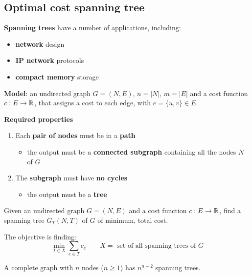 \documentclass[english]{article}
\begin{document}
\newpage

\subsection{Optimal cost spanning tree}

\textbf{Spanning trees} have a number of applications, including:

\begin{itemize}
  \item \textbf{network} design
  \item \textbf{IP network} protocols
  \item \textbf{compact memory} storage
\end{itemize}

\bigskip
\textbf{Model}:
an undirected graph \(G = (N, E), \, n = |N|, \, m = |E|\) and a cost function \(c: E \rightarrow \mathbb{R}\), that assigns a cost to each edge, with \(e = \{u, v\} \in E\).

\bigskip
\textbf{Required properties}
\begin{enumerate}
  \item Each \textbf{pair of nodes} must be in a \textbf{path}
        \begin{itemize}[label= \(\Rightarrow\)]
          \item the output must be a \textbf{connected subgraph} containing all the nodes \(N\) of \(G\)
        \end{itemize}
  \item The \textbf{subgraph} must have \textbf{no cycles}
        \begin{itemize}[label= \(\Rightarrow\)]
          \item the output must be a \textbf{tree}
        \end{itemize}
\end{enumerate}

\bigskip
\begin{definition}
  Given an undirected graph \(G = (N, E)\) and a cost function \(c: E \rightarrow \mathbb{R}\), find a spanning tree \(G_T(N, T)\) of \(G\) of minimum, total cost.
\end{definition}

The objective is finding:
\[ \displaystyle \min_{T \in X} \sum_{e \in T} c_e \qquad X = \text{ set of all spanning trees of } G \]

\begin{theorem}
  A complete graph with \(n\) nodes (\(n \geq 1\)) has \(n^{n-2}\) spanning trees.
\end{theorem}
\end{document}
